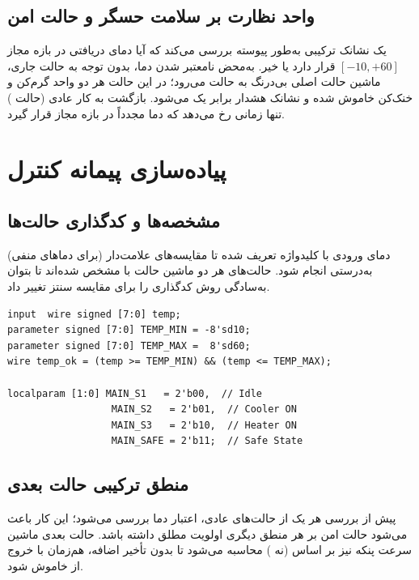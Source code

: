 \documentclass[11pt,a4paper]{article}
\begin{document}
\subsection{واحد نظارت بر سلامت حسگر و حالت امن}
یک نشانک ترکیبی به‌طور پیوسته بررسی می‌کند که آیا دمای دریافتی در بازه مجاز $[-10, +60]$ قرار دارد یا خیر. به‌محض نامعتبر شدن دما، بدون توجه به حالت جاری، ماشین حالت اصلی بی‌درنگ به حالت  می‌رود؛ در این حالت هر دو واحد گرم‌کن و خنک‌کن خاموش شده و نشانک هشدار  برابر یک می‌شود. بازگشت به کار عادی (حالت ) تنها زمانی رخ می‌دهد که دما مجدداً در بازه مجاز قرار گیرد.

\section{پیاده‌سازی پیمانه کنترل }

\subsection{مشخصه‌ها و کدگذاری حالت‌ها}
دمای ورودی با کلیدواژه  تعریف شده تا مقایسه‌های علامت‌دار (برای دماهای منفی) به‌درستی انجام شود. حالت‌های هر دو ماشین حالت با  مشخص شده‌اند تا بتوان به‌سادگی روش کدگذاری را برای مقایسه سنتز تغییر داد.

\begin{latin}
\begin{lstlisting}
input  wire signed [7:0] temp;
parameter signed [7:0] TEMP_MIN = -8'sd10;
parameter signed [7:0] TEMP_MAX =  8'sd60;
wire temp_ok = (temp >= TEMP_MIN) && (temp <= TEMP_MAX);

localparam [1:0] MAIN_S1   = 2'b00,  // Idle
                  MAIN_S2   = 2'b01,  // Cooler ON
                  MAIN_S3   = 2'b10,  // Heater ON
                  MAIN_SAFE = 2'b11;  // Safe State
\end{lstlisting}
\end{latin}

\subsection{منطق ترکیبی حالت بعدی}
پیش از بررسی هر یک از حالت‌های عادی، اعتبار دما بررسی می‌شود؛ این کار باعث می‌شود حالت امن بر هر منطق دیگری اولویت مطلق داشته باشد. حالت بعدی ماشین سرعت پنکه نیز بر اساس  (نه ) محاسبه می‌شود تا بدون تأخیر اضافه، هم‌زمان با خروج از  خاموش شود.
\end{document}
